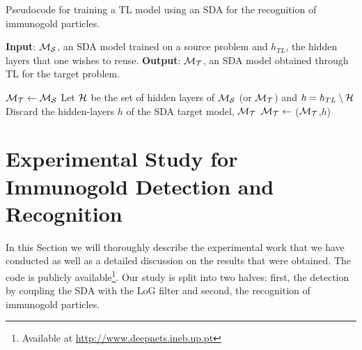 \documentclass[a4paper,11pt]{article}
\newcommand{\1}{\mathbbm{1}}
\theoremstyle{plain}
\begin{document}
\begin{algorithm*}
  \caption{Pseudocode for training a \ac{TL} model using an \ac{SDA} for the recognition of immunogold particles.}
  \label{algo:tl}
  \begin{algorithmic}[1]
    \State \textbf{Input}: ${\cal M_S}$, an \ac{SDA} model trained on a source problem and $h_{TL}$, the hidden layers that one wishes to reuse.
    \State \textbf{Output}: ${\cal M_T}$, an \ac{SDA} model obtained through TL for the target problem.


    \State ${\cal M_T} \leftarrow {\cal M_S}$ 
    \State Let ${\cal H}$ be the set of hidden layers of ${\cal M_S}$ (or ${\cal M_T}$) and $h = h_{TL} \setminus {\cal H}$\;
    \State Discard the hidden-layers $h$ of the \ac{SDA} target model, ${\cal M_T}$\;
    \State ${\cal M_T} \leftarrow$ \FineTuneNetwork(${\cal M_T}$,$h$)\;
  \end{algorithmic}
\end{algorithm*}

\section{Experimental Study for Immunogold Detection and Recognition}
\label{sec:results}
In this Section we will thoroughly describe the experimental work that we have conducted as well as a detailed discussion on the results that were obtained. The code is publicly available\footnote{Available at \url{http://www.deepnets.ineb.up.pt}}. Our study is split into two halves: first, the detection by coupling the \ac{SDA} with the \ac{LoG} filter and second, the recognition of immunogold particles.
\end{document}
